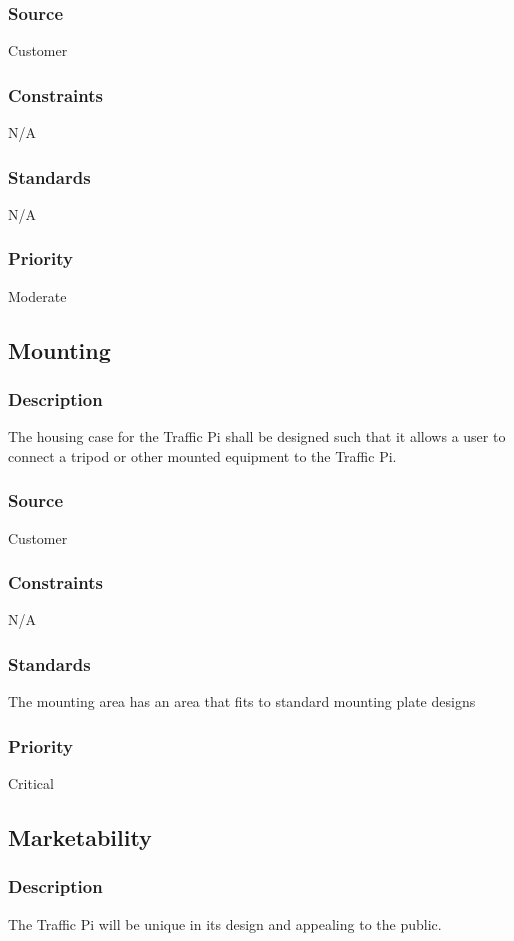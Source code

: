 \subsubsection{Source}
Customer
\subsubsection{Constraints}
N/A
\subsubsection{Standards}
N/A
\subsubsection{Priority}
Moderate

\subsection{Mounting}
\subsubsection{Description}
The housing case for the Traffic Pi shall be designed such that it allows a user to connect a tripod or other mounted equipment to the Traffic Pi.
\subsubsection{Source}
Customer
\subsubsection{Constraints}
N/A
\subsubsection{Standards}
The mounting area has an area that fits to standard mounting plate designs
\subsubsection{Priority}
Critical

\subsection{Marketability}
\subsubsection{Description}
The Traffic Pi will be unique in its design and appealing to the public.
